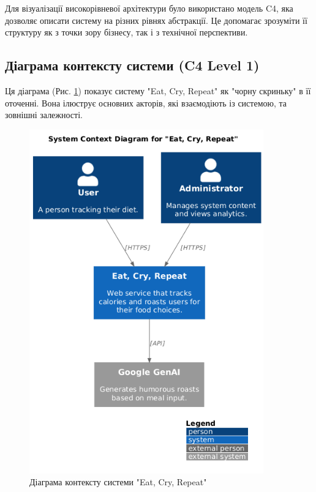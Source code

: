 \documentclass[12pt, a4paper]{article}
\begin{document}
Для візуалізації високорівневої архітектури було використано модель C4, яка
дозволяє описати систему на різних рівнях абстракції. Це допомагає зрозуміти її
структуру як з точки зору бізнесу, так і з технічної перспективи.

\subsection{Діаграма контексту системи (C4 Level 1)}

Ця діаграма (Рис. \ref{fig:c4_context}) показує систему "Eat, Cry, Repeat" як
"чорну скриньку" в її оточенні. Вона ілюструє основних акторів, які взаємодіють
із системою, та зовнішні залежності.

\begin{figure}[h!]
    \centering
    \includegraphics[width=0.9\textwidth]{c4_context.png}
    \caption{Діаграма контексту системи "Eat, Cry, Repeat"}
    \label{fig:c4_context}
\end{figure}
\end{document}
